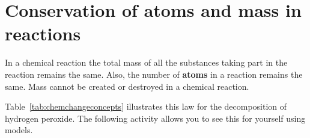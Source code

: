     \label{m38711*cid5}
            \section{Conservation of atoms and mass in reactions}
            \nopagebreak
      \label{m38711*id64489}In a chemical reaction the total mass of all the substances taking part in the reaction remains the same. Also, the number of \textbf{atoms} in a reaction remains the same. Mass cannot be created or destroyed in a chemical reaction.\par 
{}
Table~\ref{tab:chemchangeconcepts} illustrates this law for the decomposition of hydrogen peroxide. The following activity allows you to see this for yourself using models.
